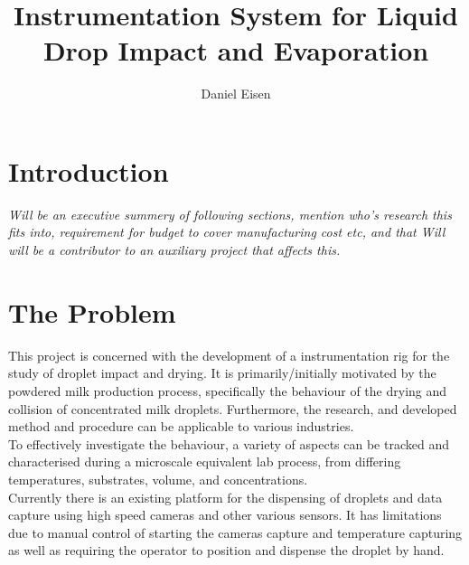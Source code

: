 \documentclass[11pt, a4paper, twoside, openright]{report}
\title{Instrumentation System for Liquid Drop Impact and Evaporation}
\author{Daniel Eisen}
\date{}
\begin{document}
\frontmatter


\begin{abstract}
\end{abstract}


\maketitle
\tableofcontents



\mainmatter


\section{Introduction}
\textit{Will be an executive summery of following sections, mention who's research this fits into, requirement for budget to cover manufacturing cost etc, and that Will will be a contributor to an auxiliary project that affects this.}

\section{The Problem}
This project is concerned with the development of a instrumentation rig for the study of droplet impact and drying. It is primarily/initially motivated by the powdered milk production process, specifically the behaviour of the drying and collision of concentrated milk droplets. Furthermore, the research, and developed method and procedure can be applicable to various industries. \\

To effectively investigate the behaviour, a variety of aspects can be tracked and characterised during a microscale equivalent lab process, from differing temperatures, substrates, volume, and concentrations. \\

Currently there is an existing platform for the dispensing of droplets and data capture using high speed cameras and other various sensors. It has limitations due to manual control of starting the cameras capture and temperature capturing as well as requiring the operator to position and dispense the droplet by hand. \\
\end{document}
